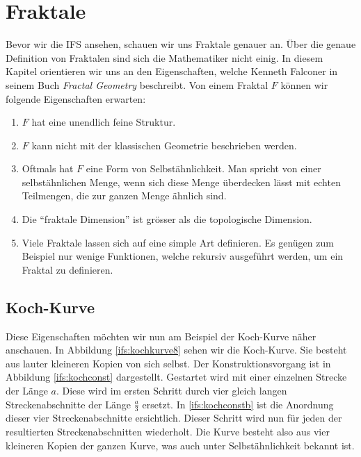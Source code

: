 %
%
%
\section{Fraktale
\label{ifs:section:teil1}}
Bevor wir die IFS ansehen, schauen wir uns Fraktale genauer an.
Über die genaue Definition von Fraktalen sind sich die Mathematiker nicht einig. 
In diesem Kapitel orientieren wir uns an den Eigenschaften, welche Kenneth Falconer in seinem Buch {\em Fractal Geometry} \cite{ifs:fractal-geometry} beschreibt.
Von einem Fraktal $F$ können wir folgende Eigenschaften erwarten: 
\begin{enumerate}
	\item $F$ hat eine unendlich feine Struktur.
	\item $F$ kann nicht mit der klassischen Geometrie beschrieben werden.
	\item Oftmals hat $F$ eine Form von Selbstähnlichkeit.
%
	Man spricht von einer selbstähnlichen Menge, wenn sich diese Menge überdecken lässt mit echten Teilmengen, die zur ganzen Menge ähnlich sind.
	\item Die ``fraktale Dimension'' ist grösser als die topologische Dimension.
%
%
%
%
	\item Viele Fraktale lassen sich auf eine simple Art definieren. Es genügen zum Beispiel nur wenige Funktionen, welche rekursiv ausgeführt werden, um ein Fraktal zu definieren.  
\end{enumerate}
\subsection{Koch-Kurve
	\label{ifs:subsection:lilkoch}}
%
%
Diese Eigenschaften möchten wir nun am Beispiel der Koch-Kurve näher anschauen.
In Abbildung \ref{ifs:kochkurve8} sehen wir die Koch-Kurve. Sie besteht aus lauter kleineren Kopien von sich selbst. 
Der Konstruktionsvorgang ist in Abbildung \ref{ifs:kochconst} dargestellt.
Gestartet wird mit einer einzelnen Strecke der Länge $a$.
Diese wird im ersten Schritt durch vier gleich langen Streckenabschnitte der Länge $\frac{a}{3}$ ersetzt.
In \ref{ifs:kochconstb} ist die Anordnung dieser vier Streckenabschnitte ersichtlich. 
Dieser Schritt wird nun für jeden der resultierten Streckenabschnitten wiederholt.
Die Kurve besteht also aus vier kleineren Kopien der ganzen Kurve, was auch unter Selbstähnlichkeit bekannt ist.


